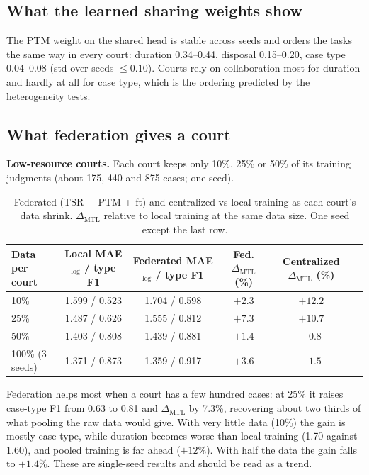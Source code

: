 \subsection*{What the learned sharing weights show}
\label{sec:ptmw}
The PTM weight on the shared head is stable across seeds and orders the tasks the same way in every
court: duration 0.34--0.44, disposal 0.15--0.20, case type 0.04--0.08 (std over seeds $\le0.10$).
Courts rely on collaboration most for duration and hardly at all for case type, which is the ordering
predicted by the heterogeneity tests.

\subsection*{What federation gives a court}
\textbf{Low-resource courts.} Each court keeps only 10\%, 25\% or 50\% of its training judgments
(about 175, 440 and 875 cases; one seed).

\begin{table}[h]\centering\small
\begin{tabular}{@{}lccccc@{}}\toprule
Data per court & Local MAE$_{\log}$ / type F1 & Federated MAE$_{\log}$ / type F1 & Fed. $\Delta_{\text{MTL}}$ (\%) & Centralized $\Delta_{\text{MTL}}$ (\%) \\ \midrule
10\% & 1.599 / 0.523 & 1.704 / 0.598 & $+2.3$ & $+12.2$ \\
25\% & 1.487 / 0.626 & 1.555 / 0.812 & $+7.3$ & $+10.7$ \\
50\% & 1.403 / 0.808 & 1.439 / 0.881 & $+1.4$ & $-0.8$ \\
100\% (3 seeds) & 1.371 / 0.873 & 1.359 / 0.917 & $+3.6$ & $+1.5$ \\ \bottomrule
\end{tabular}
\caption{Federated (TSR + PTM + ft) and centralized vs local training as each court's data shrink.
$\Delta_{\text{MTL}}$ relative to local training at the same data size. One seed except the last row.}
\label{tab:lowres}
\end{table}

Federation helps most when a court has a few hundred cases: at 25\% it raises case-type F1 from 0.63 to
0.81 and $\Delta_{\text{MTL}}$ by 7.3\%, recovering about two thirds of what pooling the raw data would give.
With very little data (10\%) the gain is mostly case type, while duration becomes worse than local
training (1.70 against 1.60), and pooled training is far ahead ($+12\%$). With half the data the gain
falls to $+1.4\%$. These are single-seed results and should be read as a trend.

